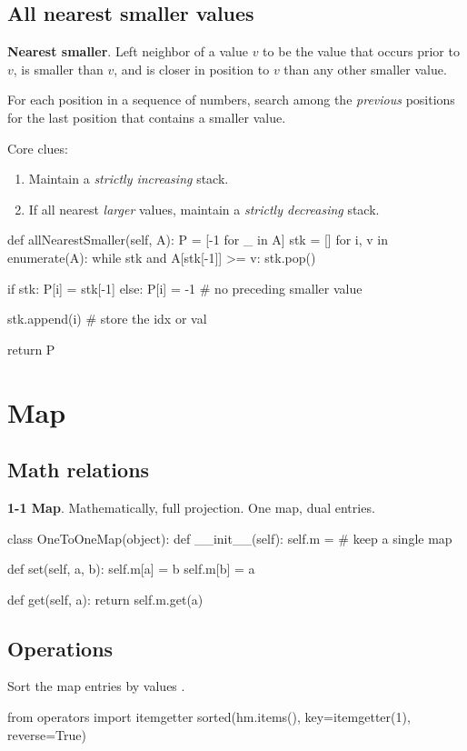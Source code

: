 \subsection{All nearest smaller values}\label{allNearestSmaller}
\textbf{Nearest smaller}. Left neighbor of a value $v$ to be the value that occurs prior to $v$, is smaller than $v$, and is closer in position to $v$ than any other smaller value.

For each position in a sequence of numbers, search among the \textit{previous} positions for the last position that contains a smaller value. 

Core clues:
\begin{enumerate}
\item Maintain a \textit{strictly increasing} stack.  
\item If all nearest \textit{larger} values, maintain a \textit{strictly decreasing} stack.  
\end{enumerate}

\begin{python}
def allNearestSmaller(self, A):
    P = [-1 for _ in A]
    stk = []
    for i, v in enumerate(A):
        while stk and A[stk[-1]] >= v: stk.pop()

        if stk:
            P[i] = stk[-1]
        else:
            P[i] = -1  # no preceding smaller value
            
        stk.append(i)  # store the idx or val

    return P
\end{python}

\section{Map}
\subsection{Math relations}
\textbf{1-1 Map}. Mathematically, full projection. One map, dual entries.
\begin{python}
class OneToOneMap(object):
    def __init__(self):
        self.m = {}  # keep a single map

    def set(self, a, b):
        self.m[a] = b
        self.m[b] = a

    def get(self, a):
        return self.m.get(a)
\end{python}
\subsection{Operations}
 Sort the map entries by values .
\begin{python}
from operators import itemgetter 
sorted(hm.items(), key=itemgetter(1), reverse=True)
\end{python}

